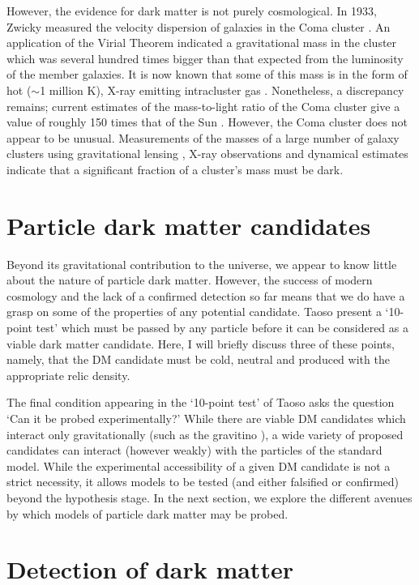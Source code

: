 However, the evidence for dark matter is not purely cosmological. In 1933, Zwicky measured the velocity dispersion of galaxies in the Coma cluster \cite{Zwicky:1933}. An application of the Virial Theorem indicated a gravitational mass in the cluster which was several hundred times bigger than that expected from the luminosity of the member galaxies. It is now known that some of this mass is in the form of hot ($\sim$1 million K), X-ray emitting intracluster gas \cite{Sanders:2013}. Nonetheless, a discrepancy remains; current estimates of the mass-to-light ratio of the Coma cluster give a value of roughly 150 times that of the Sun \cite{Fusco-Femiano:1994,Makino:1994}. However, the Coma cluster does not appear to be unusual. Measurements of the masses of a large number of galaxy clusters using gravitational lensing \cite{Okabe:2013}, X-ray observations \cite{Ettori:2013} and dynamical estimates \cite{Carlberg:1995} indicate that a significant fraction of a cluster's mass must be dark.






\section{Particle dark matter candidates}

Beyond its gravitational contribution to the universe, we appear to know little about the nature of particle dark matter. However, the success of modern cosmology and the lack of a confirmed detection so far means that we do have a grasp on some of the properties of any potential candidate. Taoso \etal \cite{Taoso:2008} present a `10-point test' which must be passed by any particle before it can be considered as a viable dark matter candidate. Here, I will briefly discuss three of these points, namely, that the DM candidate must be cold, neutral and produced with the appropriate relic density.


The final condition appearing in the `10-point test' of Taoso \etal asks the question `Can it be probed experimentally?' While there are viable DM candidates which interact only gravitationally (such as the gravitino ), a wide variety of proposed candidates can interact (however weakly) with the particles of the standard model. While the experimental accessibility of a given DM candidate is not a strict necessity, it allows models to be tested (and either falsified or confirmed) beyond the hypothesis stage. In the next section, we explore the different avenues by which models of particle dark matter may be probed.

\section{Detection of dark matter}

